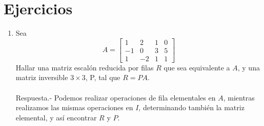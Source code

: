 \section*{Ejercicios}

\begin{enumerate}[\bfseries 1.]

    \item Sea
    $$
    A = 
	\left[
	    \begin{array}{*{4}{r}}
		1 & 2 & 1 & 0 \\
		-1 & 0 & 3 & 5 \\
		1 & -2 & 1 & 1
	    \end{array}
	\right]
    $$
    Hallar una matriz escalón reducida por filas $R$ que sea equivalente a $A$, y una matriz inversible $3\times 3$, P, tal que $R=PA.$\\\\
	Respuesta.-\; Podemos realizar operaciones de fila elementales en $A$, mientras realizamos las mismas operaciones en $I$, determinando también la matriz elemental, y así encontrar $R$ y $P$.


\end{enumerate}
